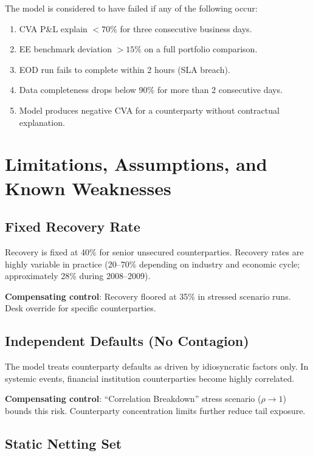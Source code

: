 \documentclass[11pt,a4paper]{article}
\begin{document}
The model is considered to have failed if any of the following occur:
\begin{enumerate}[noitemsep]
  \item CVA P\&L explain $< 70\%$ for three consecutive business days.
  \item EE benchmark deviation $> 15\%$ on a full portfolio comparison.
  \item EOD run fails to complete within 2 hours (SLA breach).
  \item Data completeness drops below 90\% for more than 2 consecutive days.
  \item Model produces negative CVA for a counterparty without contractual
        explanation.
\end{enumerate}

\section{Limitations, Assumptions, and Known Weaknesses}

\subsection{Fixed Recovery Rate}

Recovery is fixed at 40\% for senior unsecured counterparties. Recovery rates
are highly variable in practice (20--70\% depending on industry and economic
cycle; approximately 28\% during 2008--2009).

\textbf{Compensating control}: Recovery floored at 35\% in stressed scenario
runs. Desk override for specific counterparties.

\subsection{Independent Defaults (No Contagion)}

The model treats counterparty defaults as driven by idiosyncratic factors only.
In systemic events, financial institution counterparties become highly
correlated.

\textbf{Compensating control}: ``Correlation Breakdown'' stress scenario
($\rho \to 1$) bounds this risk. Counterparty concentration limits further
reduce tail exposure.

\subsection{Static Netting Set}
\end{document}
